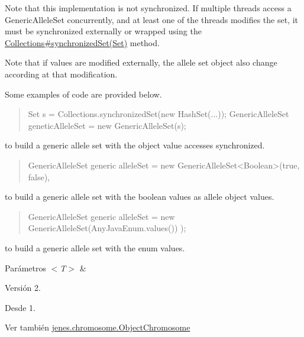 Note that this implementation is not synchronized. If multiple threads access a Generic\-Allele\-Set concurrently, and at least one of the threads modifies the set, it must be synchronized externally or wrapped using the \hyperlink{}{Collections\#synchronized\-Set(\-Set)} method. 

Note that if values are modified externally, the allele set object also change according at that modification. 

Some examples of code are provided below. 

\begin{quotation}

\begin{DoxyPre}
   Set s = Collections.synchronizedSet(new HashSet(...));
   GenericAlleleSet geneticAlleleSet = new GenericAlleleSet(s);
\end{DoxyPre}
\end{quotation}
to build a generic allele set with the object value accesses synchronized. 

\begin{quotation}

\begin{DoxyPre}
   GenericAlleleSet generic alleleSet = new GenericAlleleSet<Boolean>(true, false),
\end{DoxyPre}
\end{quotation}
to build a generic allele set with the boolean values as allele object values. 

\begin{quotation}

\begin{DoxyPre}
   GenericAlleleSet generic alleleSet = new GenericAlleleSet(AnyJavaEnum.values()) );
\end{DoxyPre}
\end{quotation}
to build a generic allele set with the enum values. 


\begin{DoxyParams}{Parámetros}
{\em $<$\-T$>$} & \\
\hline
\end{DoxyParams}
\begin{DoxyVersion}{Versión}
2. 
\end{DoxyVersion}
\begin{DoxySince}{Desde}
1.
\end{DoxySince}
\begin{DoxySeeAlso}{Ver también}
\hyperlink{classjenes_1_1chromosome_1_1_object_chromosome}{jenes.\-chromosome.\-Object\-Chromosome} 
\end{DoxySeeAlso}


